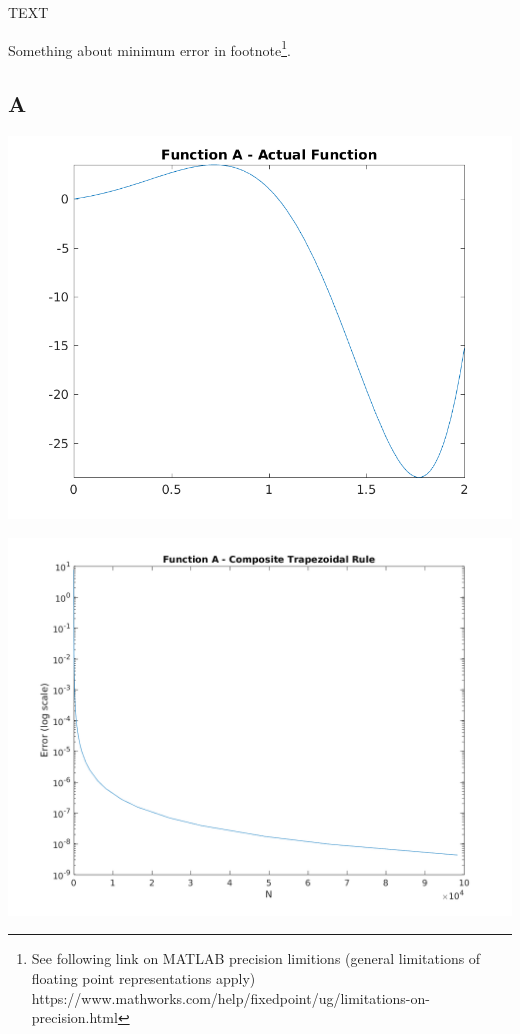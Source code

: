 \documentclass[a4paper]{article}
\begin{document}
TEXT


Something about minimum error in footnote\footnote{See following link on MATLAB precision limitions (general limitations of floating point representations apply) https://www.mathworks.com/help/fixedpoint/ug/limitations-on-precision.html}.


\subsection{A}\label{results:a}

\begin{center}
	\includegraphics[width=1\textwidth]{../output/a_actual.png}
	\label{fig:a_act}
\end{center}

\begin{center}
	\includegraphics[width=1\textwidth]{../output/a_trapezoidal.png}
	\label{fig:a_trap}
\end{center}
\end{document}
